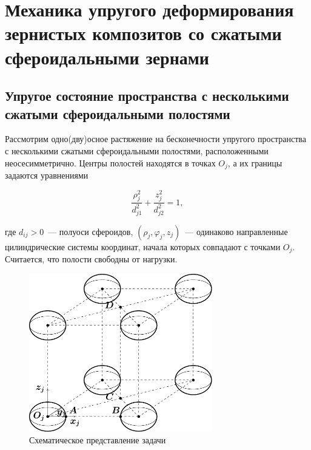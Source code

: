 
\chapter[Механика упругого деформирования зернистых композитов со сжатыми сфероидальными зернами]{Механика упругого деформирования зернистых композитов со сжатыми сфероидальными зернами}

\section[Упругое состояние пространства с несколькими сжатыми сфероидальными полостями]{Упругое состояние пространства с несколькими сжатыми сфероидальными полостями}

Рассмотрим одно(дву)осное растяжение на бесконечности упругого пространства с несколькими сжатыми сфероидальными полостями, расположенными неосесимметрично. Центры полостей находятся в точках $O_j$, а их границы задаются уравнениями

\begin{equation}
\frac{{\rho _j^2}}{{d_{j1}^2}} + \frac{{z_j^2}}{{d_{j2}^2}} = 1,
\label{eq:10:12}
\end{equation}

\noindent где $d_{ij}>0$~--- полуоси сфероидов, $(\rho_j,\varphi_j,z_j)$~--- одинаково направленные цилиндрические системы координат, начала которых совпадают с точками $O_j$. Считается, что полости свободны от нагрузки.

\begin{figure}[h!]
\centering
\includegraphics[width=8cm]{oblate-spheroids.pdf}
\caption{Схематическое представление задачи}
\label{f:10:1o}
\end{figure}

